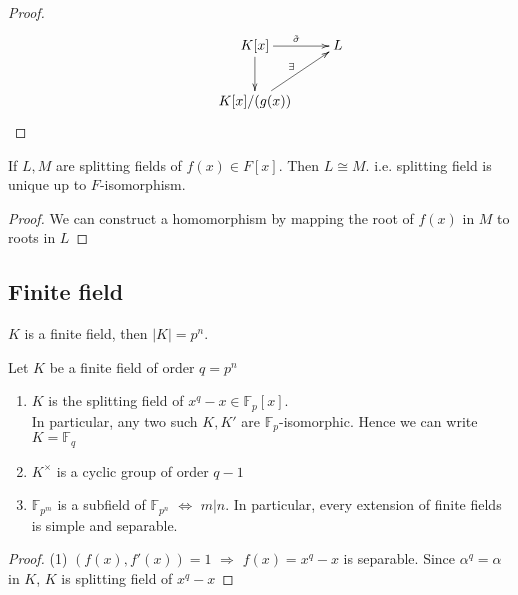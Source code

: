   \begin{proof}
    \[
        \xymatrix{
            &K[x]\ar[r]^{\tilde{\sigma} }\ar[d]&L\\
            &K[x]/(g(x))\ar[ru]^{\exists}
        }    
    \]
  \end{proof}   
  \begin{corollary}
    If  $ L,M  $ are splitting fields of  $ f(x)\in F[x]  $. Then  $ L\cong M $. i.e. splitting field is unique up to  $ F $-isomorphism.  
  \end{corollary}
  \begin{proof}
    We can construct a homomorphism by mapping the root of  $ f(x)  $ in  $ M  $ to roots in  $ L $ 
  \end{proof}
\subsection{Finite field}
 $ K  $ is a finite field, then  $ |K|=p^n $.
 \begin{theorem}
    Let  $ K  $ be a finite field of order  $ q=p^n $
    \begin{enumerate}[(1)]
         \item $ K  $ is the splitting field of  $ x^q-x\in \mathbb{F}_p[x] $.\\
         In particular, any two such  $ K,K'  $ are  $ \mathbb{F}_p $-isomorphic. Hence we can write  $ K=\mathbb{F}_q $
         \item  $ K^\times  $ is a cyclic group of order  $ q-1 $    
         \item  $ \mathbb{F}_{p^m} $ is a subfield of  $ \mathbb{F}_{p^n} $  $ \Leftrightarrow $  $ m|n $. In particular, every extension of finite fields is simple and separable. 
    \end{enumerate} 
 \end{theorem} 
 \begin{proof}
    (1)  $ (f(x),f'(x))=1 $ $ \Rightarrow  $  $ f(x)=x^q-x $ is separable. Since  $ \alpha^q=\alpha $ in  $ K  $,  $ K  $ is splitting field of  $ x^q-x $  
 \end{proof}
